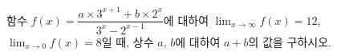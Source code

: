 함수 $f(x)=\dfrac{a\times 3^{x+1}+b\times 2^x}{3^x-2^{x-1}}$에 대하여 $\displaystyle\lim_{x\to\infty}f(x)=12$, $\displaystyle\lim_{x\to 0}f(x)=8$일 때, 상수 $a$, $b$에 대하여 $a+b$의 값을 \mbox{구하시오.}
